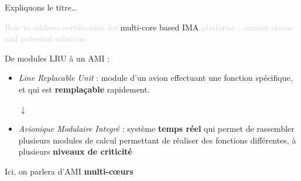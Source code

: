 \documentclass{beamer}
\begin{document}
\begin{frame}[t]{Expliquons le titre\ldots}
  
  \begin{center}
    \begin{mdframed}[style=yellowbox]
      {\small\textcolor{lightgray}{How to address certification for} multi-core based IMA \textcolor{lightgray}{platforms :
       current status and potential solutions}}
       \end{mdframed}
  \end{center}
  
      De modules LRU à un AMI :
      \begin{itemize}
          \item \textit{Line Replacable Unit} : module d'un avion effectuant une fonction
			  spécifique, et qui est \textbf{remplaçable} rapidement. \\
          \begin{center}
              $\downarrow$
          \end{center}
          \item \textit{Avionique Modulaire Integré} : système \textbf{temps réel} qui permet de rassembler plusieurs 
          modules de calcul permettant de réaliser des fonctions différentes, à plusieurs
		  \textbf{niveaux de criticité} \\\pause
      \end{itemize}
	  Ici, on parlera d'AMI \textbf{multi-cœurs}
\end{frame}
\end{document}
